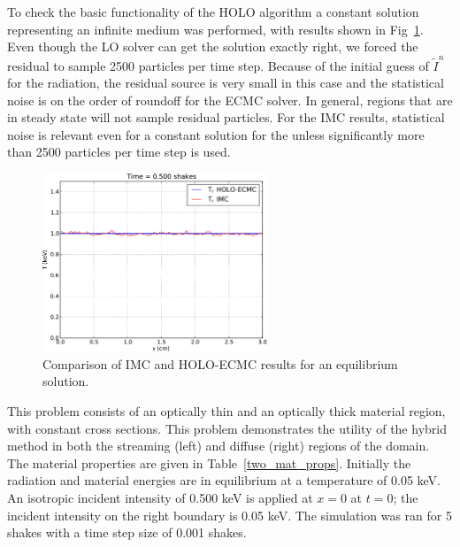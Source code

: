 \documentclass{mc2013}
\begin{document}
To check the basic functionality of the HOLO algorithm a constant solution
representing an infinite medium was performed, with results shown in Fig~\ref{constant_fig}.  Even though the LO solver can get the
solution exactly right, we forced the residual to sample 2500 particles per time step.  Because of
the initial guess of $\tilde I^n$ for the radiation, the residual source is very small in
this case and the statistical noise is on the order of roundoff for the ECMC solver.
In general, regions that are in steady state will not sample residual particles.
  For the IMC results, statistical noise is relevant even for a constant solution for the
unless significantly more than 2500 particles per time step is used. 
\begin{figure}[htb]
   \centering
   \includegraphics[width=0.6\textwidth]{constant.pdf}
   \caption{\label{constant_fig} Comparison of IMC and HOLO-ECMC results for
       an equilibrium solution.}
\end{figure}



This problem consists of an optically thin and an optically thick material region,
with constant cross sections.  This problem demonstrates the utility of the
hybrid method in both the streaming (left) and diffuse (right) regions of the domain.  The material properties are given in
Table~\ref{two_mat_props}.  Initially the radiation and material energies are in
equilibrium at a temperature of 0.05 keV.  An isotropic incident intensity of 0.500 keV
is applied at $x=0$ at $t=0$; the incident intensity on the right boundary is 0.05
keV.  The simulation was ran for 5 shakes with a
time step size of 0.001 shakes.  
\end{document}
